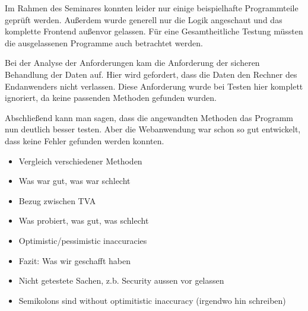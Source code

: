 \documentclass[ngerman]{article}
\begin{document}
Im Rahmen des Seminares konnten leider nur einige beispielhafte Programmteile geprüft werden. Außerdem wurde generell nur die Logik angeschaut und das komplette Frontend außenvor gelassen. Für eine Gesamtheitliche Testung müssten die ausgelassenen Programme auch betrachtet werden.

Bei der Analyse der Anforderungen kam die Anforderung der sicheren Behandlung der Daten auf. Hier wird gefordert, dass die Daten den Rechner des Endanwenders nicht verlassen. Diese Anforderung wurde bei Testen hier komplett ignoriert, da keine passenden Methoden gefunden wurden.

Abschließend kann man sagen, dass die angewandten Methoden das Programm nun deutlich besser testen.
Aber die Webanwendung war schon so gut entwickelt, dass keine Fehler gefunden werden konnten.

\begin{itemize}
    \item Vergleich verschiedener Methoden
    \item Was war gut, was war schlecht
    \item Bezug zwischen TVA
    \item Was probiert, was gut, was schlecht
    \item Optimistic/pessimistic inaccuracies
    \item Fazit: Was wir geschafft haben
    \item Nicht getestete Sachen, z.b. Security aussen vor gelassen
    \item Semikolons sind without optimitistic inaccuracy (irgendwo hin schreiben)
\end{itemize}
\end{document}
